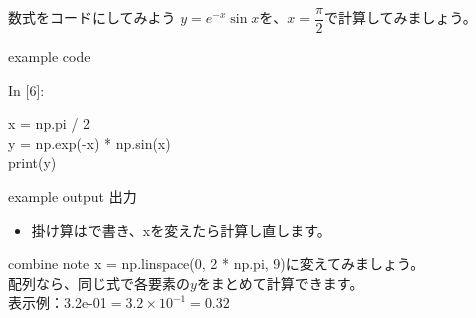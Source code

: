 \documentclass[12pt,aspectratio=43]{beamer}
\begin{document}
\begin{frame}[t]{数式をコードにしてみよう}
  \setlength{\parskip}{0pt}
  \(y=e^{-x}\sin x\)を、\(x=\dfrac{\pi}{2}\)で計算してみましょう。
  \par\vspace{1mm}
  \begin{beamercolorbox}[wd=\textwidth,sep=1.8mm]{example code}
    {\codefont\fontsize{9}{10}\selectfont\textcolor{courseblue}{In [6]:}\par}
    \begingroup\codefont\fontsize{16}{18}\selectfont
      x = np.pi / \textcolor{codevalue}{2}\\
      y = np.\textcolor{codebuiltin}{exp}(-x) * np.\textcolor{codebuiltin}{sin}(x)\\
      \textcolor{codebuiltin}{print}(y)\par
    \endgroup
  \end{beamercolorbox}\par
  \begin{beamercolorbox}[wd=\textwidth,sep=.5mm,leftskip=1.3mm]{example output}
    {\fontsize{9}{11}\selectfont\textcolor{black!65}{出力}}\quad
    {\codefont\fontsize{16}{18}}
  \end{beamercolorbox}
  \par\vspace{1mm}
  \begin{itemize}
    \setlength{\itemsep}{1mm}
    \item 掛け算は{\codefont *}で書き、{\codefont x}を変えたら計算し直します。
  \end{itemize}
  \vspace{1mm}
  \begin{beamercolorbox}[wd=\textwidth,sep=1.5mm]{combine note}
    \small {\codefont x = np.linspace(0, 2 * np.pi, 9)}に変えてみましょう。\\
    配列なら、同じ式で各要素の$y$をまとめて計算できます。\\[1mm]
    表示例：{\codefont 3.2e-01}\enspace $=3.2\times10^{-1}=0.32$
  \end{beamercolorbox}
\end{frame}
\end{document}
